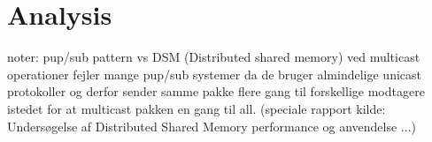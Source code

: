 \chapter{Analysis}


noter:
pup/sub pattern vs DSM (Distributed shared memory)
ved multicast operationer fejler mange pup/sub systemer da de bruger almindelige unicast protokoller og derfor sender samme pakke flere gang til forskellige modtagere istedet for at multicast pakken en gang til all. (speciale rapport kilde: Undersøgelse af Distributed Shared Memory performance og anvendelse ...)

